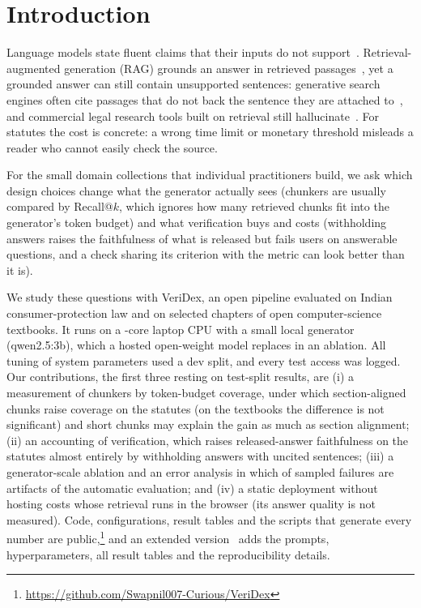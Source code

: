 \section{Introduction}
\label{sec:intro}

Language models state fluent claims that their inputs do not support~\cite{ji2023survey}.
Retrieval-augmented generation (RAG) grounds an answer in retrieved passages~\cite{lewis2020rag,karpukhin2020dpr}, yet a grounded answer can still contain unsupported sentences: generative search engines often cite passages that do not back the sentence they are attached to~\cite{liu2023verifiability}, and commercial legal research tools built on retrieval still hallucinate~\cite{magesh2024hallucination,dahl2024fictions}.
For statutes the cost is concrete: a wrong time limit or monetary threshold misleads a reader who cannot easily check the source.

For the small domain collections that individual practitioners build, we ask which design choices change what the generator actually sees (chunkers are usually compared by Recall@$k$, which ignores how many retrieved chunks fit into the generator's token budget) and what verification buys and costs (withholding answers raises the faithfulness of what is released but fails users on answerable questions, and a check sharing its criterion with the metric can look better than it is).

We study these questions with VeriDex, an open pipeline evaluated on Indian consumer-protection law and on selected chapters of  open computer-science textbooks.
It runs on a -core laptop CPU with a small local generator (qwen2.5:3b), which a hosted open-weight model replaces in an ablation. All tuning of system parameters used a dev split, and every test access was logged.
Our contributions, the first three resting on test-split results, are (i) a measurement of chunkers by token-budget coverage, under which section-aligned chunks raise coverage on the statutes (on the textbooks the difference is not significant) and short chunks may explain the gain as much as section alignment; (ii) an accounting of verification, which raises released-answer faithfulness on the statutes almost entirely by withholding answers with uncited sentences; (iii) a generator-scale ablation and an error analysis in which  of  sampled failures are artifacts of the automatic evaluation; and (iv) a static deployment without hosting costs whose retrieval runs in the browser (its answer quality is not measured).
Code, configurations, result tables and the scripts that generate every number are public,\footnote{\url{https://github.com/Swapnil007-Curious/VeriDex}} and an extended version~\cite{shukla2026veridexext} adds the prompts, hyperparameters, all result tables and the reproducibility details.
